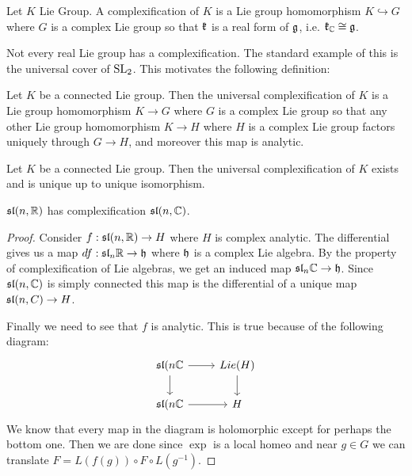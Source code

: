 \documentclass[12pt]{article}
\begin{document}
\begin{definition}
    Let $K$ Lie Group. A complexification of $K$ is a Lie group homomorphism $K\hookrightarrow G$
    where $G$ is a complex Lie group so that $\mf k$ is a real form of $\mf g$, i.e. $\mf k_\C\cong \mf g$.
\end{definition}

Not every real Lie group has a complexification. The standard example of this 
is the universal cover of $\SL_2$. This motivates the following definition: \begin{definition}
    Let $K$ be a connected Lie group. Then the universal complexification of $K$
    is a Lie group homomorphism $K\to G$ where $G$ is a complex Lie group so that
    any other Lie group homomorphism $K\to H$ where $H$ is a complex Lie group factors
    uniquely through $G\to H$, and moreover this map is analytic.
\end{definition}

\begin{theorem}
    Let $K$ be a connected Lie group. Then the universal complexification of $K$
    exists and is unique up to unique isomorphism.
\end{theorem}

\begin{theorem}
    $\sl(n,\R)$ has complexification $\sl(n,\C)$.
\end{theorem}

\begin{proof}
    Consider $f:\sl(n,\R)\to H$ where $H$ is complex analytic. The differential gives us a map 
    $df:\mf{sl}_n\R\to \mf h$ where $\mf h$ is a complex Lie algebra. By the property of 
    complexification of Lie algebras, we get an induced map $\mf{sl}_n\C\to \mf h$. 
    Since $\mf{sl}(n,\C)$ is simply connected this map is the differential of a unique map $\sl(n,C)\to H$.

    Finally we need to see that $f$ is analytic. This is true because of the following diagram:
\[\begin{tikzcd}
	\sl(n\C & Lie(H) \\
	\sl(n\C & H
	\arrow[from=1-1, to=1-2]
	\arrow[from=1-2, to=2-2]
	\arrow[from=2-1, to=2-2]
	\arrow[from=1-1, to=2-1]
\end{tikzcd}\] We know that every map in the diagram is holomorphic except for perhaps the bottom one. Then we are done
since $\exp$ is a local homeo and near $g\in G$ we can translate $F = L(f(g))\circ F\circ L(g^{-1})$.\end{proof}
\end{document}
